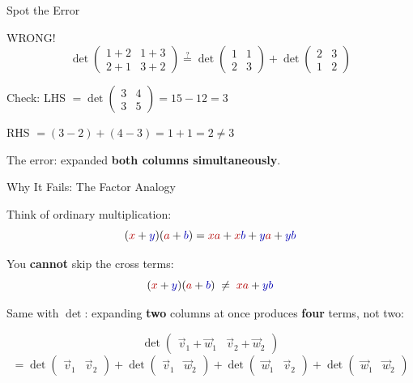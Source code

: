 \documentclass[10pt]{beamer}
\theoremstyle{definition}
\newcommand{\x}[1]{\alert{\textbf{#1}}}
\newcommand{\rd}[1]{{\color{red!70!black}#1}}
\newcommand{\bl}[1]{{\color{blue!70!black}#1}}
\begin{document}
\begin{frame}{Spot the Error}

\begin{exampleblock}{\rd{WRONG!}}
$$
\det \begin{pmatrix} 1+2 & 1+3 \\ 2+1 & 3+2 \end{pmatrix}
\stackrel{?}{=}
\det \begin{pmatrix} 1 & 1 \\ 2 & 3 \end{pmatrix}
+ \det \begin{pmatrix} 2 & 3 \\ 1 & 2 \end{pmatrix}
$$
\end{exampleblock}

\vfill
\pause

Check: LHS $= \det \begin{pmatrix} 3 & 4 \\ 3 & 5 \end{pmatrix} = 15 - 12 = 3$

\vfill

RHS $= (3-2) + (4-3) = 1 + 1 = 2 \neq 3$

\vfill

The error: expanded \x{both columns simultaneously}.

\end{frame}


\begin{frame}{Why It Fails: The Factor Analogy}

Think of ordinary multiplication:
$$
(\rd{x}+\bl{y})(\rd{a}+\bl{b}) = \rd{xa} + \rd{x}\bl{b} + \bl{y}\rd{a} + \bl{yb}
$$

\vfill

You \x{cannot} skip the cross terms:
$$
(\rd{x}+\bl{y})(\rd{a}+\bl{b}) \;\neq\; \rd{xa} + \bl{yb}
$$

\vfill

Same with $\det$: expanding \x{two} columns at once produces \x{four} terms, not two:

$$
\det\begin{pmatrix} \vec{v}_1 + \vec{w}_1 & \vec{v}_2 + \vec{w}_2 \end{pmatrix}
$$
$$
= \det\begin{pmatrix} \vec{v}_1 & \vec{v}_2 \end{pmatrix}
+ \det\begin{pmatrix} \vec{v}_1 & \vec{w}_2 \end{pmatrix}
+ \det\begin{pmatrix} \vec{w}_1 & \vec{v}_2 \end{pmatrix}
+ \det\begin{pmatrix} \vec{w}_1 & \vec{w}_2 \end{pmatrix}
$$

\end{frame}
\end{document}
